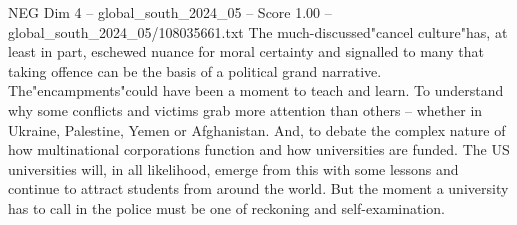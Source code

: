 \begin{textsample}{NEG Dim 4 – global\_south\_2024\_05 – Score 1.00 – global\_south\_2024\_05/108035661.txt}
The much-discussed"cancel culture"has, at least in part, eschewed nuance for moral certainty and signalled to many that taking offence can be the basis of a political grand narrative.
The"encampments"could have been a moment to teach and learn.
To understand why some conflicts and victims grab more attention than others -- whether in Ukraine, Palestine, Yemen or Afghanistan.
And, to debate the complex nature of how multinational corporations function and how universities are funded.
The US universities will, in all likelihood, emerge from this with some lessons and continue to attract students from around the world.
But the moment a university has to call in the police must be one of reckoning and self-examination.

\end{textsample}
